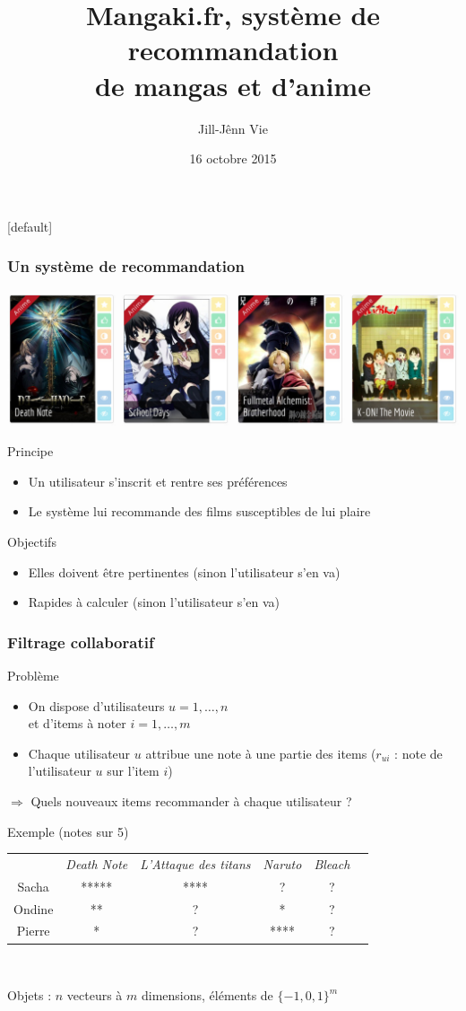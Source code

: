 \documentclass[handout]{beamer}
\title[]
{Mangaki.fr, système de recommandation\\de mangas et d'anime}
\author[]
{Jill-Jênn Vie}
\institute[]
{Lycée Thiers}
\date
{16 octobre 2015}
\begin{document}

{
[default]
\begin{frame}
	\titlepage
\end{frame}
}

\begin{frame}
	\frametitle{Un système de recommandation}
	\includegraphics[width=\linewidth]{figures/decks.jpg}
	\begin{block}{Principe}
	\begin{itemize}
	\item Un utilisateur s'inscrit et rentre ses préférences
	\item Le système lui recommande des films susceptibles de lui plaire
	\end{itemize}
	\end{block}
	\pause
	\begin{block}{Objectifs}
	\begin{itemize}
	\item Elles doivent être \alert{pertinentes} (sinon l'utilisateur s'en va)
	\item \alert{Rapides} à calculer (sinon l'utilisateur s'en va)
	\end{itemize}
	\end{block}
\end{frame}

\begin{frame}
	\frametitle{Filtrage collaboratif}
	\begin{block}{Problème}
		\begin{itemize}[<+->]
		\item On dispose d'utilisateurs $u = 1, \ldots, n$\\et d'items à noter $i = 1, \ldots, m$
		\item Chaque utilisateur $u$ attribue une note à une partie des items (\alert{$r_{ui}$} : note de l'utilisateur $u$ sur l'item $i$)
		\end{itemize}
		\pause
		$\Rightarrow$ Quels nouveaux items recommander à chaque utilisateur ?
	\end{block}
	\pause
	\begin{exampleblock}{Exemple (notes sur 5)}
		\begin{tabular}{cccccc}
		& \emph{Death Note} & \emph{L'Attaque des titans} & \emph{Naruto} & \emph{Bleach}\\
		Sacha & ***** & **** & ? & ?\\
		Ondine & ** & ? & * & ?\\
		Pierre & * & ? & **** & ?
		\end{tabular}\\
	\end{exampleblock}
	\pause
	Objets : $n$ vecteurs à $m$ dimensions, éléments de $\{-1, 0, 1\}^m$
\end{frame}
\end{document}
